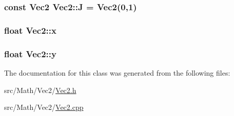 \subsubsection[{\texorpdfstring{J}{J}}]{\setlength{\rightskip}{0pt plus 5cm}const {\bf Vec2} Vec2\+::J = {\bf Vec2}(0,1)\hspace{0.3cm}{\ttfamily [static]}}\hypertarget{class_vec2_ae4587db58fa8083a0e07d07bf6f5b89f}{}\label{class_vec2_ae4587db58fa8083a0e07d07bf6f5b89f}
\subsubsection[{\texorpdfstring{x}{x}}]{\setlength{\rightskip}{0pt plus 5cm}float Vec2\+::x}\hypertarget{class_vec2_adf8ee322d4b4bcc04146762c018d731f}{}\label{class_vec2_adf8ee322d4b4bcc04146762c018d731f}
\subsubsection[{\texorpdfstring{y}{y}}]{\setlength{\rightskip}{0pt plus 5cm}float Vec2\+::y}\hypertarget{class_vec2_a30543787e62f6d915543cf1dfb04c094}{}\label{class_vec2_a30543787e62f6d915543cf1dfb04c094}


The documentation for this class was generated from the following files\+:\begin{DoxyCompactItemize}
\item 
src/\+Math/\+Vec2/\hyperlink{_vec2_8h}{Vec2.\+h}\item 
src/\+Math/\+Vec2/\hyperlink{_vec2_8cpp}{Vec2.\+cpp}\end{DoxyCompactItemize}
